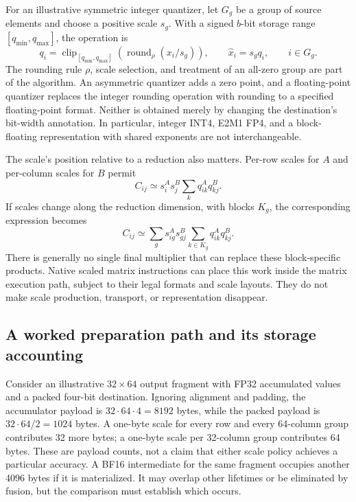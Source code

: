 For an illustrative symmetric integer quantizer, let $G_g$ be a group of source elements and choose a positive scale $s_g$. With a signed $b$-bit storage range $[q_{\min},q_{\max}]$, the operation is
\begin{equation}
 q_i=\operatorname{clip}_{[q_{\min},q_{\max}]}
       \left(\operatorname{round}_{\rho}(x_i/s_g)\right),
 \qquad \widehat{x}_i=s_gq_i,\qquad i\in G_g.
 \label{eq:u003_quant}
\end{equation}
The rounding rule $\rho$, scale selection, and treatment of an all-zero group are part of the algorithm. An asymmetric quantizer adds a zero point, and a floating-point quantizer replaces the integer rounding operation with rounding to a specified floating-point format. Neither is obtained merely by changing the destination's bit-width annotation. In particular, integer INT4, E2M1 FP4, and a block-floating representation with shared exponents are not interchangeable.

The scale's position relative to a reduction also matters. Per-row scales for $A$ and per-column scales for $B$ permit
\begin{equation}
 C_{ij}\simeq s^A_i s^B_j\sum_k q^A_{ik}q^B_{kj}.
 \label{eq:u003_outer_scales}
\end{equation}
If scales change along the reduction dimension, with blocks $K_g$, the corresponding expression becomes
\begin{equation}
 C_{ij}\simeq\sum_g s^A_{ig}s^B_{gj}
                     \sum_{k\in K_g}q^A_{ik}q^B_{kj}.
 \label{eq:u003_inner_scales}
\end{equation}
There is generally no single final multiplier that can replace these block-specific products. Native scaled matrix instructions can place this work inside the matrix execution path, subject to their legal formats and scale layouts. They do not make scale production, transport, or representation disappear.

\subsection{A worked preparation path and its storage accounting}

Consider an illustrative $32\times64$ output fragment with FP32 accumulated values and a packed four-bit destination. Ignoring alignment and padding, the accumulator payload is $32\cdot64\cdot4=8192$ bytes, while the packed payload is $32\cdot64/2=1024$ bytes. A one-byte scale for every row and every 64-column group contributes 32 more bytes; a one-byte scale per 32-column group contributes 64 bytes. These are payload counts, not a claim that either scale policy achieves a particular accuracy. A BF16 intermediate for the same fragment occupies another 4096 bytes if it is materialized. It may overlap other lifetimes or be eliminated by fusion, but the comparison must establish which occurs.

